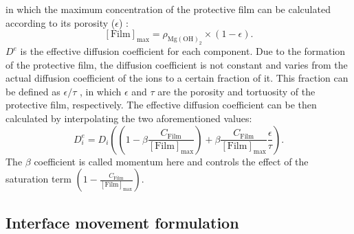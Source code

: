 in which the maximum concentration of the protective film can be calculated according to its porosity ($\epsilon$) \cite{Bajger2016}:
\begin{equation} \label{eq:film_max}
[\mathrm{Film}]_{\max }=\rho_{\mathrm{Mg}(\mathrm{OH})_{2}} \times(1-\epsilon).
\end{equation}
$D^e$ is the effective diffusion coefficient for each component. Due to the formation of the protective film, the diffusion coefficient is not constant and varies from the actual diffusion coefficient of the ions to a certain fraction of it. This fraction can be defined as ${\epsilon}/{\tau}$ \cite{Grathwohl1998,Hoeche2014}, in which $\epsilon$ and $\tau$ are the porosity and tortuosity of the protective film, respectively. The effective diffusion coefficient can be then calculated by interpolating the two aforementioned values:
\begin{equation} \label{eq:diff_coeff}
D_{i}^{e}=D_{i}\left(\left(1-\beta \frac{C_{\mathrm{Film}}}{[\mathrm{Film}]_{\max }}\right)+\beta \frac{C_{\mathrm{Film}}}{[\mathrm{Film}]_{\max }} \frac{\epsilon}{\tau}\right).
\end{equation}
The $\beta$ coefficient is called momentum here and controls the effect of the saturation term $(1-\frac{C_{\mathrm{Film}}}{[\mathrm{Film}]_{\max }})$. %

\subsection{Interface movement formulation}

